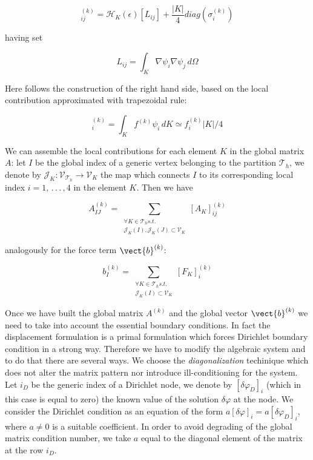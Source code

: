 \begin{equation}
[A_K]_{ij}^{(k)}  = \mathcal{H}_K(\epsilon)\left[
L_{ij}
\right]
+
\dfrac{|K|}{4}diag(\sigma^{(k)}_i)
\end{equation}

having set

\begin{equation}
L_{ij} = \int_K \nabla \psi_i  \nabla \psi_j \, d\Omega
\end{equation}

Here follows the construction of the right hand side, based on the local contribution approximated with trapezoidal rule:

\begin{equation}
[F_K]_i^{(k)} = \int_K f^{(k)} \psi_i \, dK \simeq f^{(k)}_i |K| / 4 
\end{equation}

We can assemble the local contributions for each element $K$ in the global matrix $A$: let $I$ be the global index of a generic vertex belonging to the partition $\mathcal{T}_h$, we denote by $\mathcal{J}_K: \mathcal{V}_{\mathcal{T}_h} \rightarrow \mathcal{V}_{K}$ the map which connects $I$ to its corresponding local index $i=1, \, . \, . \, . \, , 4$ in the element $K$. Then we have 

\begin{equation}
A_{IJ}^{(k)} = \sum_{\substack{\forall K \in \mathcal{T}_h s.t. \\ \mathcal{J}_K(I),\mathcal{J}_K(J) \subset \mathcal{V}_K}}
 [A_K]_{ij}^{(k)}
\end{equation}

analogously for the force term $\vect{b}^{(k)}$:

\begin{equation}
b_{I}^{(k)} = \sum_{\substack{\forall K \in \mathcal{T}_h s.t. \\ \mathcal{J}_K(I) \subset \mathcal{V}_K}}
 [F_K]_{i}^{(k)}
\end{equation}

Once we have built the global matrix $A^{(k)}$ and the global vector $\vect{b}^{(k)}$ we need to take into account the essential boundary conditions. In fact the displacement formulation is a primal formulation which forces Dirichlet boundary condition in a strong way. Therefore we have to modify the algebraic system and to do that there are several ways. We choose the \textit{diagonalization} techinique which does not alter the matrix pattern nor introduce ill-conditioning for the system.  Let $i_D$ be the generic index of a Dirichlet node, we denote by $[\delta \varphi_{D}]_i$ (which in this case is equal to zero) the known value of the solution $\delta \varphi $ at the node. We consider the Dirichlet condition as an equation of the form $a [\delta \varphi]_i = a [\delta \varphi_{D}]_i$, where $a\neq 0$ is a suitable coefficient. In order to avoid degrading of the global matrix condition number, we take $a$ equal to the diagonal element of the matrix at the row  $i_D$.

